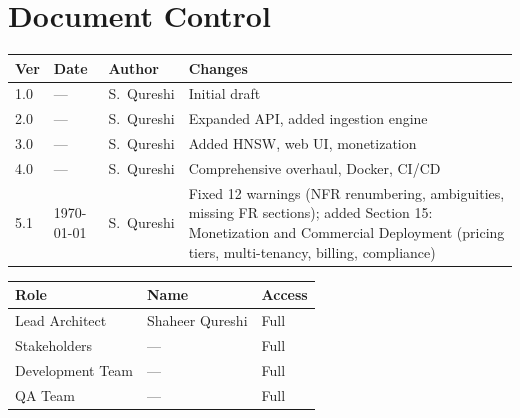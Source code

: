 \documentclass[11pt,a4paper]{article}
\begin{document}
\newpage
\section*{Document Control}

\begin{reqbox}
\begin{longtable}{@{}p{1.5cm}p{2.5cm}p{2cm}p{8cm}@{}}
\toprule
\textbf{Ver} & \textbf{Date} & \textbf{Author} & \textbf{Changes} \\
\midrule
\endhead
1.0 & --- & S.\ Qureshi & Initial draft \\
2.0 & --- & S.\ Qureshi & Expanded API, added ingestion engine \\
3.0 & --- & S.\ Qureshi & Added HNSW, web UI, monetization \\
4.0 & --- & S.\ Qureshi & Comprehensive overhaul, Docker, CI/CD \\
5.1 & \today & S.\ Qureshi & Fixed 12 warnings (NFR renumbering, ambiguities, missing FR sections); added Section 15: Monetization and Commercial Deployment (pricing tiers, multi-tenancy, billing, compliance) \\
\bottomrule
\end{longtable}
\end{reqbox}

\vspace{0.5cm}

\begin{reqbox}
\begin{tabular}{@{}lll@{}}
\toprule
\textbf{Role} & \textbf{Name} & \textbf{Access} \\
\midrule
Lead Architect & Shaheer Qureshi & Full \\
Stakeholders & --- & Full \\
Development Team & --- & Full \\
QA Team & --- & Full \\
\bottomrule
\end{tabular}
\end{reqbox}

\newpage
\tableofcontents
\newpage
\end{document}
